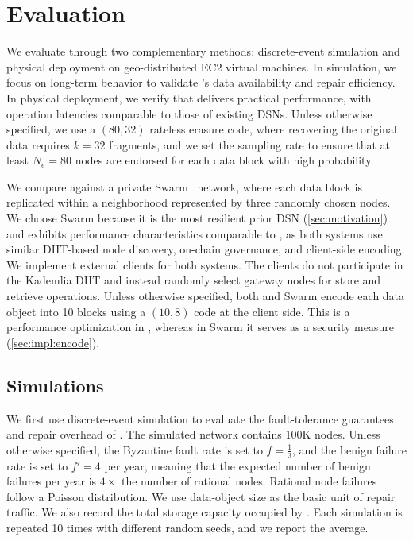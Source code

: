 \section{Evaluation}
\label{sec:eval}

We evaluate \sys through two complementary methods: discrete-event simulation and physical deployment on geo-distributed EC2 virtual machines.
In simulation, we focus on long-term behavior to validate \sys's data availability and repair efficiency.
In physical deployment, we verify that \sys delivers practical performance, with operation latencies comparable to those of existing DSNs.
Unless otherwise specified, we use a $(80, 32)$ rateless erasure code, where recovering the original data requires $k=32$ fragments, and we set the sampling rate to ensure that at least $N_e = 80$ nodes are endorsed for each data block with high probability.\footnotemark
{}

We compare \sys against a private Swarm~\cite{swarm} network, where each data block is replicated within a neighborhood represented by three randomly chosen nodes.
We choose Swarm because it is the most resilient prior DSN (\cref{sec:motivation}) and exhibits performance characteristics comparable to \sys, as both systems use similar DHT-based node discovery, on-chain governance, and client-side encoding.
We implement external clients for both systems.
The clients do not participate in the Kademlia DHT and instead randomly select gateway nodes for store and retrieve operations.
Unless otherwise specified, both \sys and Swarm encode each data object into 10 blocks using a $(10, 8)$ code at the client side.
This is a performance optimization in \sys, whereas in Swarm it serves as a security measure (\cref{sec:impl:encode}).

\subsection{Simulations}

We first use discrete-event simulation to evaluate the fault-tolerance guarantees and repair overhead of \sys.
The simulated network contains 100K nodes.
Unless otherwise specified, the Byzantine fault rate is set to $f=\frac{1}{3}$, and the benign failure rate is set to $f'=4$ per year, meaning that the expected number of benign failures per year is $4\times$ the number of rational nodes.
Rational node failures follow a Poisson distribution.
We use data-object size as the basic unit of repair traffic.
We also record the total storage capacity occupied by \sys.
Each simulation is repeated 10 times with different random seeds, and we report the average.

